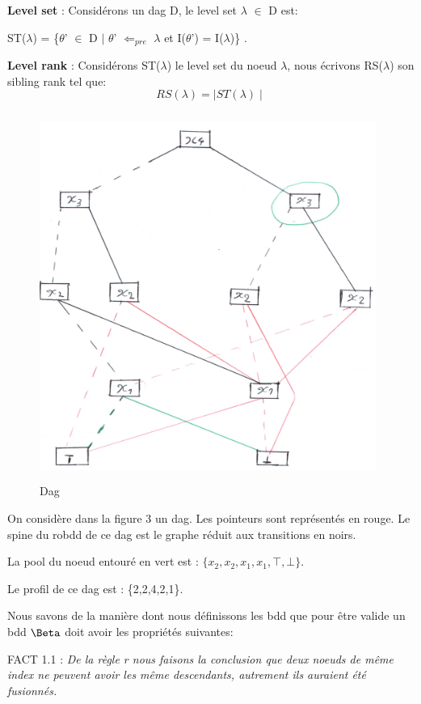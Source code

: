 \documentclass[french]{article}
\begin{document}
\textbf{Level set} : Considérons un dag D, le level set \(\lambda\) \(\in\) D est:
\begin{center}
ST(\(\lambda\)) = \{\(\theta\)’ \(\in\) D \(\mid\) \(\theta\)’ \(\Leftarrow_{pre}\) \(\lambda\) et I(\(\theta\)’) = I(\(\lambda\))\} . 
\end{center}
\textbf{Level rank} : Considérons ST(\(\lambda\)) le level set du noeud \(\lambda\), nous écrivons RS(\(\lambda\)) son sibling rank tel que:
\[ RS(\lambda) = \mid ST(\lambda)\mid \]
\newpage
\begin{figure}[htp]
    \centering
    \includegraphics[width=11cm, height=12cm]{tree21}
    \caption{Dag}
    \label{fig:Figure2}
\end{figure}
On considère dans la figure 3 un dag. Les pointeurs sont représentés en rouge. Le spine du robdd de ce dag est le graphe réduit aux transitions en noirs.

La pool du noeud entouré en vert est : \(\{x_2,x_2,x_1,x_1,\top,\bot\}\). 

Le profil de ce dag est : \{2,2,4,2,1\}.

\vspace{5mm} %

Nous savons de la manière dont nous définissons les bdd que pour être valide un bdd \(\Beta\) doit avoir les propriétés suivantes:

FACT 1.1 : \emph{De la règle r nous faisons la conclusion que deux noeuds de même index ne peuvent avoir les même descendants, autrement ils auraient été fusionnés.}
\end{document}
